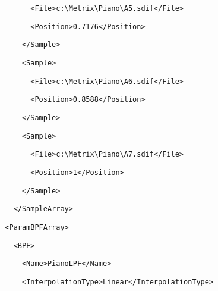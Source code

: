 \documentclass[a4paper,english,american]{book}
\begin{document}
{\begin{spacing}{0.8}
{}
\par
\texttt{\footnotesize ~~~~~~~~<File>c:\textbackslash{}Metrix\textbackslash{}Piano\textbackslash{}A5.sdif</File>}{\footnotesize\par
}
\par
\texttt{\footnotesize ~~~~~~~~<Position>0.7176</Position>}{\footnotesize\par
}
\par
\texttt{\footnotesize ~~~~~~</Sample>}{\footnotesize\par
}
\par
\texttt{\footnotesize ~~~~~~<Sample>}{\footnotesize\par
}
\par
\texttt{\footnotesize ~~~~~~~~<File>c:\textbackslash{}Metrix\textbackslash{}Piano\textbackslash{}A6.sdif</File>}{\footnotesize\par
}
\par
\texttt{\footnotesize ~~~~~~~~<Position>0.8588</Position>}{\footnotesize\par
}
\par
\texttt{\footnotesize ~~~~~~</Sample>}{\footnotesize\par
}
\par
\texttt{\footnotesize ~~~~~~<Sample>}{\footnotesize\par
}
\par
\texttt{\footnotesize ~~~~~~~~<File>c:\textbackslash{}Metrix\textbackslash{}Piano\textbackslash{}A7.sdif</File>}{\footnotesize\par
}
\par
\texttt{\footnotesize ~~~~~~~~<Position>1</Position>}{\footnotesize\par
}
\par
\texttt{\footnotesize ~~~~~~</Sample>}{\footnotesize\par
}
\par
\texttt{\footnotesize ~~~~</SampleArray>}{\footnotesize\par
}
\par
\texttt{\footnotesize ~~<ParamBPFArray>}{\footnotesize\par
}
\par
\texttt{\footnotesize ~~~~<BPF>}{\footnotesize\par
}
\par
\texttt{\footnotesize ~~~~~~<Name>PianoLPF</Name>}{\footnotesize\par
}
\par
\texttt{\footnotesize ~~~~~~<InterpolationType>Linear</InterpolationType>}{\footnotesize\par
}
\end{spacing}}
\end{document}
